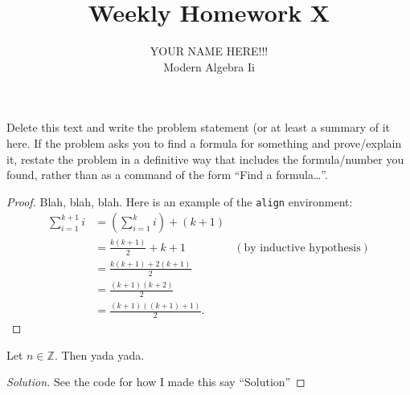 \documentclass[12pt]{amsart}
\newcommand{\Z}{\mathbb{Z}} %
\newenvironment{theorem}[2][Theorem]{\begin{trivlist}
\item[\hskip \labelsep {\bfseries #1}\hskip \labelsep {\bfseries #2.}]}{\end{trivlist}}
\newenvironment{problem}[2][Problem]{\begin{trivlist}
\item[\hskip \labelsep {\bfseries #1}\hskip \labelsep {\bfseries #2.}]}{\end{trivlist}}
\begin{document}
 
 
\title{Weekly Homework X}%
\author{YOUR NAME HERE!!!\\ %
Modern Algebra Ii} %
 
\maketitle
 
\begin{problem}{x} %
Delete this text and write the problem statement (or at least a
summary of it here. If the problem asks you to find a formula for
something and prove/explain it, restate the problem in a definitive
way that includes the formula/number you found, rather than as a
command of the form ``Find a formula\dots''. 
\end{problem}
 
\begin{proof}
Blah, blah, blah.  Here is an example of the \texttt{align} environment:
\begin{align*}
\sum_{i=1}^{k+1}i & = \left(\sum_{i=1}^{k}i\right) +(k+1)\\ 
& = \frac{k(k+1)}{2}+k+1 & (\text{by inductive hypothesis})\\
& = \frac{k(k+1)+2(k+1)}{2}\\
& = \frac{(k+1)(k+2)}{2}\\
& = \frac{(k+1)((k+1)+1)}{2}.
\end{align*}
\end{proof}
 
\begin{theorem}{x.yz}
Let \(n\in \Z\).  Then yada yada.
\end{theorem}
 
\begin{proof}[Solution] %
  See the code for how I made this say ``Solution''

\end{proof}
 
 
\end{document}
